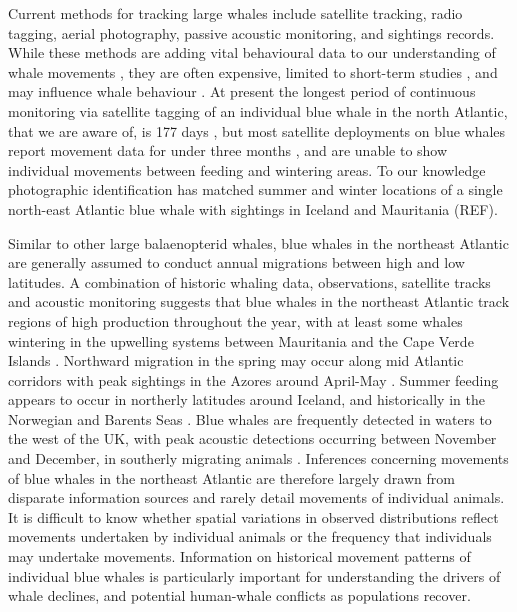 \documentclass[a4paper,12pt]{article}
\begin{document}
Current methods for tracking large whales include satellite tracking, radio tagging, aerial photography, passive acoustic monitoring, and sightings records. 
While these methods are adding vital behavioural data to our understanding of whale movements \cite{borger15,mcdonald2006biogeographic,bailey2009behavioural,mate2007evolution,silva2013north}, they are often expensive, limited to short-term studies \cite{bailey2009behavioural,best2015tag,mate2007evolution}, and may influence whale behaviour \cite{walker2012review}.
At present the longest period of continuous monitoring via satellite tagging of an individual blue whale in the north Atlantic, that we are aware of, is 177 days \cite{lesage2017foraging}, but most satellite deployments on blue whales report movement data for under three months \cite{heide2001new,silva2013north, bailey2009behavioural,lesage2017foraging}, and are unable to show individual movements between feeding and wintering areas. 
To our knowledge photographic identification has matched summer and winter locations of a single north-east Atlantic blue whale with sightings in Iceland and Mauritania (REF). 

Similar to other large balaenopterid whales, blue whales in the northeast Atlantic are generally assumed to conduct annual migrations between high and low latitudes. 
A combination of historic whaling data, observations, satellite tracks and acoustic monitoring suggests that blue whales in the northeast Atlantic track regions of high production throughout the year, with at least some whales wintering in the upwelling systems between Mauritania and the Cape Verde Islands \cite{baines2014upwellings}. 
Northward migration in the spring may occur along mid Atlantic corridors with peak sightings in the Azores around April-May \cite{silva2013north}. 
Summer feeding appears to occur in northerly latitudes around Iceland, and historically in the Norwegian and Barents Seas \cite{pike2009note}. 
Blue whales are frequently detected in waters to the west of the UK, with peak acoustic detections occurring between November and December, in southerly migrating animals \cite{reeves2004historical,baines2017autumn,charif2009acoustic,visser2011timing}.
Inferences concerning movements of blue whales in the northeast Atlantic are therefore largely drawn from disparate information sources and rarely detail movements of individual animals. 
It is difficult to know whether spatial variations in observed distributions reflect movements undertaken by individual animals or the frequency that individuals may undertake movements. 
Information on historical movement patterns of individual blue whales is particularly important for understanding the drivers of whale declines, and potential human-whale conflicts as populations recover. 
\end{document}
